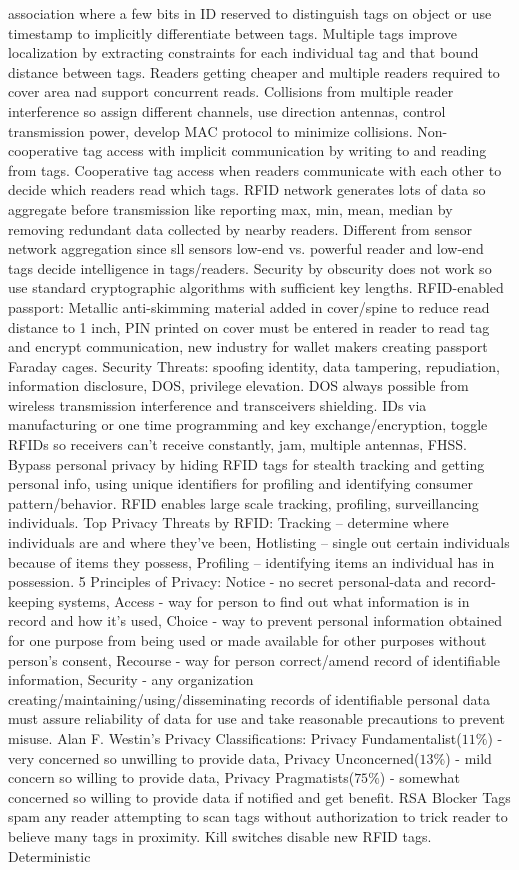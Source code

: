 \documentclass[9pt]{extarticle}
\begin{document}
\begin{multicols}{2}
association where a few bits in ID reserved to distinguish tags on object or use timestamp to implicitly differentiate between tags. Multiple tags improve localization by extracting constraints for each individual tag and that bound distance between tags. Readers getting cheaper and multiple readers required to cover area nad support concurrent reads. Collisions from multiple reader interference so assign different channels, use direction antennas, control transmission power, develop MAC protocol to minimize collisions. Non-cooperative tag access with implicit communication by writing to and reading from tags. Cooperative tag access when readers communicate with each other to decide which readers read which tags. RFID network generates lots of data so aggregate before transmission like reporting max, min, mean, median by removing redundant data collected by nearby readers. Different from sensor network aggregation  since sll sensors low-end vs. powerful reader and low-end tags decide intelligence in tags/readers. Security by obscurity does not work so use standard cryptographic algorithms with sufficient key lengths. RFID-enabled passport: Metallic anti-skimming material added in cover/spine to reduce read distance to 1 inch, PIN printed on cover must be entered in reader to read tag and encrypt communication, new industry for wallet makers creating passport Faraday cages. Security Threats: spoofing identity, data tampering, repudiation, information disclosure, DOS, privilege elevation. DOS always possible from wireless transmission interference and transceivers shielding. IDs via manufacturing or one time programming and key exchange/encryption, toggle RFIDs so receivers can't receive constantly, jam, multiple antennas, FHSS. Bypass personal privacy by hiding RFID tags for stealth tracking and getting personal info, using unique identifiers for profiling and identifying consumer pattern/behavior. RFID enables large scale tracking, profiling, surveillancing individuals. Top Privacy Threats by RFID: Tracking – determine where individuals are and where they've been, Hotlisting – single out certain individuals because of items they possess, Profiling – identifying items an individual has in possession. 5 Principles of Privacy: Notice - no secret personal-data and record-keeping systems, Access - way for person to find out what information is in record and how it's used, Choice - way to prevent personal information obtained for one purpose from being used or made available for other purposes without person’s consent, Recourse - way for person correct/amend record of identifiable information, Security - any organization creating/maintaining/using/disseminating records of identifiable personal data must assure reliability of data for use and take reasonable precautions to prevent misuse. Alan F. Westin’s Privacy Classifications: Privacy Fundamentalist($11\%$) - very concerned so unwilling to provide data, Privacy Unconcerned($13\%$) - mild concern so willing to provide data, Privacy Pragmatists($75\%$) - somewhat concerned so willing to provide data if notified and get benefit. RSA Blocker Tags spam any reader attempting to scan tags without authorization to trick reader to believe many tags in proximity. Kill switches disable new RFID tags. Deterministic 
\end{multicols}
\end{document}

